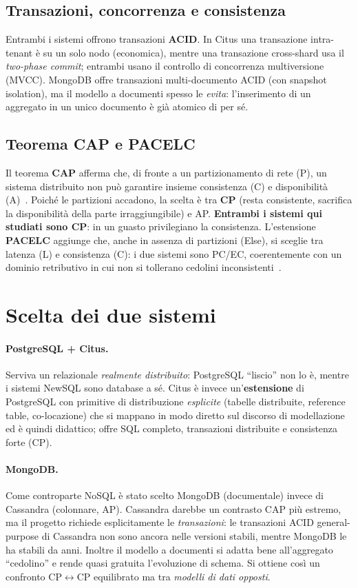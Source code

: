 \subsection{Transazioni, concorrenza e consistenza}
Entrambi i sistemi offrono transazioni \textbf{ACID}. In Citus una transazione intra-tenant è su un solo nodo
(economica), mentre una transazione cross-shard usa il \emph{two-phase commit}; entrambi usano il controllo
di concorrenza multiversione (MVCC). MongoDB offre transazioni multi-documento ACID (con snapshot isolation),
ma il modello a documenti spesso le \emph{evita}: l'inserimento di un aggregato in un unico documento è già
atomico di per sé.

\subsection{Teorema CAP e PACELC}
Il teorema \textbf{CAP} afferma che, di fronte a un partizionamento di rete (P), un sistema distribuito non
può garantire insieme consistenza (C) e disponibilità (A)~\cite{gilbert2002cap}. Poiché le partizioni
accadono, la scelta è tra \textbf{CP} (resta consistente, sacrifica la disponibilità della parte
irraggiungibile) e AP. \textbf{Entrambi i sistemi qui studiati sono CP}: in un guasto privilegiano la
consistenza. L'estensione \textbf{PACELC} aggiunge che, anche in assenza di partizioni (Else), si sceglie tra
latenza (L) e consistenza (C): i due sistemi sono PC/EC, coerentemente con un dominio retributivo in cui non
si tollerano cedolini inconsistenti~\cite{abadi2012pacelc}.

\section{Scelta dei due sistemi}
\label{sec:scelta-sistemi}

\paragraph{PostgreSQL + Citus.} Serviva un relazionale \emph{realmente distribuito}: PostgreSQL ``liscio''
non lo è, mentre i sistemi NewSQL sono database a sé. Citus è invece un'\textbf{estensione} di PostgreSQL con
primitive di distribuzione \emph{esplicite} (tabelle distribuite, reference table, co-locazione) che si
mappano in modo diretto sul discorso di modellazione ed è quindi didattico; offre SQL completo, transazioni
distribuite e consistenza forte (CP).

\paragraph{MongoDB.} Come controparte NoSQL è stato scelto MongoDB (documentale) invece di Cassandra
(colonnare, AP). Cassandra darebbe un contrasto CAP più estremo, ma il progetto richiede esplicitamente le
\emph{transazioni}: le transazioni ACID general-purpose di Cassandra non sono ancora nelle versioni stabili,
mentre MongoDB le ha stabili da anni. Inoltre il modello a documenti si adatta bene all'aggregato ``cedolino'' e rende
quasi gratuita l'evoluzione di schema. Si ottiene così un confronto CP$\leftrightarrow$CP equilibrato ma tra
\emph{modelli di dati opposti}.

